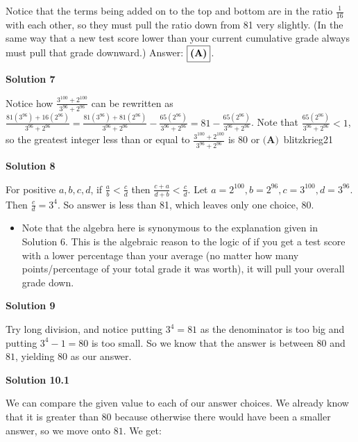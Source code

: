 \begin{enumerate}
 Notice that the terms being added on to the top and bottom are in the ratio $\frac{1}{16}$ with each other, so they must pull the ratio down from 81 very slightly. (In the same way that a new test score lower than your current cumulative grade always must pull that grade downward.) Answer: $\boxed{\text{\textbf{(A)}}}$.

 



\textbf{Solution 7}

Notice how $\frac{3^{100}+2^{100}}{3^{96}+2^{96}}$ can be rewritten as $\frac{81(3^{96})+16(2^{96})}{3^{96}+2^{96}}=\frac{81(3^{96})+81(2^{96})}{3^{96}+2^{96}}-\frac{65(2^{96})}{3^{96}+2^{96}}=81-\frac{65(2^{96})}{3^{96}+2^{96}}$. Note that $\frac{65(2^{96})}{3^{96}+2^{96}}<1$, so the greatest integer less than or equal to  $\frac{3^{100}+2^{100}}{3^{96}+2^{96}}$ is $80$ or $\boxed{\textbf{(A)}}$~blitzkrieg21

 



\textbf{Solution 8}

For positive $a, b, c, d$, if $\frac{a}{b}<\frac{c}{d}$ then $\frac{c+a}{d+b}<\frac{c}{d}$. Let $a=2^{100}, b=2^{96}, c=3^{100}, d=3^{96}$. Then $\frac{c}{d}=3^4$. So answer is less than 81, which leaves only one choice, 80.

 
            \begin{itemize}
        \item Note that the algebra here is synonymous to the explanation given in Solution 6. This is the algebraic reason to the logic of if you get a test score with a lower percentage than your average (no matter how many points/percentage of your total grade it was worth), it will pull your overall grade down.
            \end{itemize}
            



\textbf{Solution 9}

Try long division, and notice putting $3^4=81$ as the denominator is too big and putting $3^4-1=80$ is too small. So we know that the answer is between $80$ and $81$, yielding $80$ as our answer.

 



\textbf{Solution 10.1}

We can compare the given value to each of our answer choices. We already know that it is greater than $80$ because otherwise there would have been a smaller answer, so we move onto $81$. We get:


\end{enumerate}
